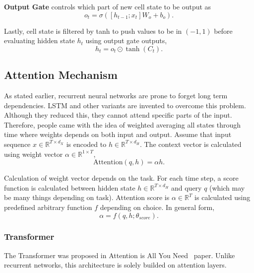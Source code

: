 \textbf{Output Gate} controls which part of new cell state to be output as
\begin{equation}
\label{eqn:lstm_out}
o_t = \sigma( [h_{t-1}; x_t] W_o + b_o).
\end{equation}

Lastly, cell state is filtered by tanh to push values to be in $(-1,1)$ before evaluating hidden state $h_t$ using output gate outputs,
\begin{equation}
h_t = o_t \odot \tanh(C_t).
\end{equation}

\subsection{Attention Mechanism}

As stated earlier, recurrent neural networks are prone to forget long term dependencies. 
LSTM and other variants are invented to overcome this problem. 
Although they reduced this, they cannot attend specific parts of the input. 
Therefore, people came with the idea of weighted averaging all states through time where weights depends on both input and output. 
Assume that input sequence $x \in \mathbb{R}^{T \times d_X}$ is encoded to $h \in \mathbb{R}^{T \times d_H}$. 
The context vector is calculated using weight vector $\alpha \in \mathbb{R}^{1 \times T}$,
\begin{equation}
\mathrm{Attention}(q, h) = \alpha h. %
\label{eq:attention_generic}
\end{equation}

Calculation of weight vector depends on the task. 
For each time step, a score function is calculated between hidden state $h \in \mathbb{R}^{T \times d_H}$ and query $q$ (which may be many things depending on task). 
Attention score is $\alpha \in \mathbb{R}^{T}$ is calculated using predefined arbitrary function $f$ depending on choice. In general form,  
\begin{equation}
\alpha = f(q, h; \theta_{score}).
\end{equation}

\subsubsection{Transformer}

The Transformer was proposed in Attention is All You Need~ \cite{vaswani_attention_2017} paper. 
Unlike recurrent networks, this architecture is solely builded on attention layers. 

